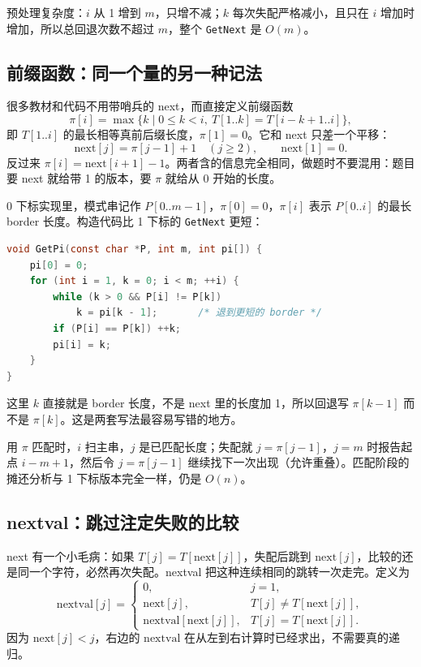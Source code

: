 预处理复杂度：$i$ 从 1 增到 $m$，只增不减；$k$ 每次失配严格减小，且只在 $i$ 增加时增加，所以总回退次数不超过 $m$，整个 \texttt{GetNext} 是 $O(m)$。

\subsection{前缀函数：同一个量的另一种记法}

很多教材和代码不用带哨兵的 next，而直接定义前缀函数
\[
\pi[i]=\max\{k\mid 0\le k<i,\ T[1..k]=T[i-k+1..i]\},
\]
即 $T[1..i]$ 的最长相等真前后缀长度，$\pi[1]=0$。它和 next 只差一个平移：
\[
\mathrm{next}[j]=\pi[j-1]+1\quad(j\ge2),\qquad \mathrm{next}[1]=0.
\]
反过来 $\pi[i]=\mathrm{next}[i+1]-1$。两者含的信息完全相同，做题时不要混用：题目要 next 就给带 1 的版本，要 $\pi$ 就给从 0 开始的长度。

0 下标实现里，模式串记作 $P[0..m-1]$，$\pi[0]=0$，$\pi[i]$ 表示 $P[0..i]$ 的最长 border 长度。构造代码比 1 下标的 \texttt{GetNext} 更短：
\begin{lstlisting}[language=C]
void GetPi(const char *P, int m, int pi[]) {
    pi[0] = 0;
    for (int i = 1, k = 0; i < m; ++i) {
        while (k > 0 && P[i] != P[k])
            k = pi[k - 1];       /* 退到更短的 border */
        if (P[i] == P[k]) ++k;
        pi[i] = k;
    }
}
\end{lstlisting}
这里 $k$ 直接就是 border 长度，不是 next 里的长度加 1，所以回退写 $\pi[k-1]$ 而不是 $\pi[k]$。这是两套写法最容易写错的地方。

用 $\pi$ 匹配时，$i$ 扫主串，$j$ 是已匹配长度；失配就 $j=\pi[j-1]$，$j=m$ 时报告起点 $i-m+1$，然后令 $j=\pi[j-1]$ 继续找下一次出现（允许重叠）。匹配阶段的摊还分析与 1 下标版本完全一样，仍是 $O(n)$。

\subsection{nextval：跳过注定失败的比较}

next 有一个小毛病：如果 $T[j]=T[\mathrm{next}[j]]$，失配后跳到 $\mathrm{next}[j]$，比较的还是同一个字符，必然再次失配。nextval 把这种连续相同的跳转一次走完。定义为
\[
\mathrm{nextval}[j]=
\begin{cases}
0, & j=1,\\
\mathrm{next}[j], & T[j]\ne T[\mathrm{next}[j]],\\
\mathrm{nextval}[\mathrm{next}[j]], & T[j]=T[\mathrm{next}[j]].
\end{cases}
\]
因为 $\mathrm{next}[j]<j$，右边的 $\mathrm{nextval}$ 在从左到右计算时已经求出，不需要真的递归。

